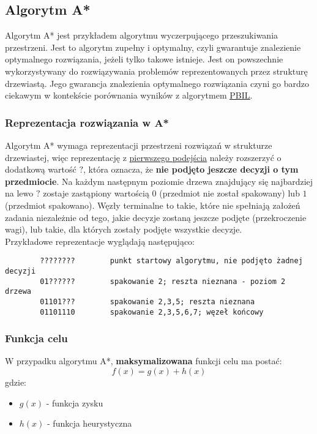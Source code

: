 \documentclass[11pt]{article}
\begin{document}
\subsection{Algorytm A*}
\label{sec:orgd1b064a}
Algorytm A* jest przykładem algorytmu wyczerpującego przeszukiwania przestrzeni. Jest to algorytm zupełny i optymalny, czyli gwarantuje znalezienie optymalnego rozwiązania, jeżeli tylko takowe istnieje. Jest on powszechnie wykorzystywany do rozwiązywania problemów reprezentowanych przez strukturę drzewiastą. Jego gwarancja znalezienia optymalnego rozwiązania czyni go bardzo ciekawym w kontekście porównania wyników z algorytmem \hyperref[sec:org5c31017]{\uline{PBIL}}.

\subsubsection{Reprezentacja rozwiązania w A*}
\label{sec:org4ecd5a9}
Algorytm A* wymaga reprezentacji przestrzeni rozwiązań w strukturze drzewiastej, więc reprezentację z \hyperref[sec:org7c490b7]{\uline{pierwszego podejścia}} należy rozszerzyć o dodatkową wartość $?$, która oznacza, że \textbf{nie podjęto jeszcze decyzji o tym przedmiocie}. Na każdym następnym poziomie drzewa znajdujący się najbardziej na lewo $?$ zostaje zastąpiony wartością $0$ (przedmiot nie został spakowany) lub $1$ (przedmiot spakowano). Węzły terminalne to takie, które nie spełniają założeń zadania niezależnie od tego, jakie decyzje zostaną jeszcze podjęte (przekroczenie wagi), lub takie, dla których zostały podjęte wszystkie decyzje.\\
Przykładowe reprezentacje wyglądają następująco:
\begin{verbatim}
        ????????        punkt startowy algorytmu, nie podjęto żadnej decyzji
        01??????        spakowanie 2; reszta nieznana - poziom 2 drzewa
        01101???        spakowanie 2,3,5; reszta nieznana
        01101110        spakowanie 2,3,5,6,7; węzeł końcowy
\end{verbatim}

\subsubsection{Funkcja celu}
\label{sec:orgd7b7848}
W przypadku algorytmu A*, \textbf{maksymalizowana} funkcji celu ma postać:
$$
f(x) = g(x) + h(x)
$$
gdzie:
\begin{itemize}
\item $g(x)$ - funkcja zysku
\item $h(x)$ - funkcja heurystyczna
\end{itemize}
\end{document}
